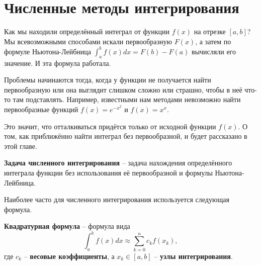 \documentclass[../main.tex]{subfile}
\begin{document}
\section{Численные методы интегрирования}

Как мы находили определённый интеграл от функции $f(x)$ на отрезке $[a,b]$? Мы
всевозможными способами искали первообразную $F(x)$, а затем по формуле
Ньютона-Лейбница $\int_a^bf(x)dx=F(b)-F(a)$ вычисляли его значение. И эта
формула работала.

Проблемы начинаются тогда, когда у функции не получается найти первообразную
или она выглядит слишком сложно или страшно, чтобы в неё что-то там подставлять. Например,
известными нам методами невозможно найти первообразные функций $f(x)=e^{-x^2}$
и $f(x)=x^x$.

Это значит, что отталкиваться придётся только от исходной функции $f(x)$. О том,
как приближённо найти интеграл без первообразной, и будет рассказано в этой главе.

\begin{define}
	\textbf{Задача численного интегрирования} -- задача нахождения
	определённого интеграла функции без использования её первообразной и
	формулы Ньютона-Лейбница.
\end{define}

Наиболее часто для численного интегрирования используется следующая формула.

\begin{define}
	\textbf{Квадратурная формула} -- формула вида
	\[\int_a^bf(x)dx\approx\sum_{k=0}^n c_kf(x_k),\]
	где $c_k$ -- \textbf{весовые коэффициенты}, а $x_k\in[a,b]$ --
	\textbf{узлы интегрирования}.
\end{define}
\end{document}
